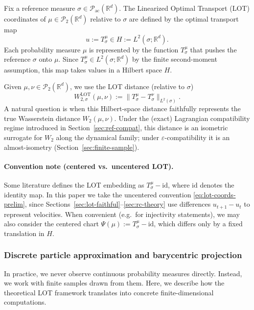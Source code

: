 \documentclass[11pt]{article}
\newcommand{\R}{\mathbb{R}}
\newcommand{\1}{\mathbf{1}}
\begin{document}
Fix a reference measure $\sigma\in\mathcal{P}_{\mathrm{ac}}(\R^d)$. The Linearized Optimal Transport (LOT) coordinates of $\mu\in\mathcal{P}_2(\R^d)$ relative to $\sigma$ are defined by the optimal transport map
\begin{equation}\label{eq:lot-coords-prelim}
u := T_\sigma^\mu \in H := L^2(\sigma;\R^d).
\end{equation}
Each probability measure $\mu$ is represented by the function $T_\sigma^\mu$ that pushes the reference $\sigma$ onto $\mu$.  Since $T_\sigma^\mu\in L^2(\sigma;\R^d)$ by the finite second-moment assumption, this map takes values in a Hilbert space $H$. 

Given $\mu,\nu\in\mathcal{P}_2(\R^d)$, we use the LOT distance (relative to $\sigma$)
\begin{equation}\label{eq:lot-distance-prelim}
W_{2,\sigma}^{\mathrm{LOT}}(\mu,\nu):=\|T_\sigma^\mu-T_\sigma^\nu\|_{L^2(\sigma)}.
\end{equation}
A natural question is when this Hilbert-space distance faithfully represents the true Wasserstein distance $W_2(\mu,\nu)$. Under the (exact) Lagrangian compatibility regime introduced in Section~\ref{sec:ref-compat}, this distance is an isometric surrogate for $W_2$ along the dynamical family; under $\varepsilon$-compatibility it is an almost-isometry (Section~\ref{sec:finite-sample}).

\paragraph{Convention note (centered vs.\ uncentered LOT).}
Some literature defines the LOT embedding as $T_\sigma^\mu-\mathrm{id}$, where $\mathrm{id}$ denotes the identity map. In this paper we take the uncentered convention \eqref{eq:lot-coords-prelim}, since Sections~\ref{sec:lot-faithful}--\ref{sec:rc-theory} use differences $u_{t+1}-u_t$ to represent velocities. When convenient (e.g.\ for injectivity
statements), we may also consider the centered chart $\Psi(\mu):=T_\sigma^\mu-\mathrm{id}$, which differs only by a fixed translation in $H$.

\subsubsection*{Discrete particle approximation and barycentric projection}\label{sec:prelim-discrete} 
In practice, we never observe continuous probability measures directly. Instead, we work with finite samples drawn from them. Here, we describe how the theoretical LOT framework translates into concrete finite-dimensional computations.
\end{document}
